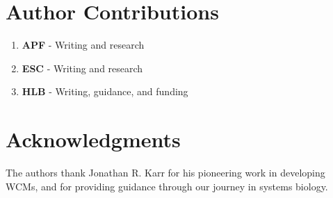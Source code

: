 \section*{Author Contributions}
\begin{enumerate}
    \item \textbf{APF} - Writing and research
    \item \textbf{ESC} - Writing and research
    \item \textbf{HLB} - Writing, guidance, and funding
\end{enumerate}

\section*{Acknowledgments}
The authors thank Jonathan R. Karr for his pioneering work in developing WCMs, and for providing guidance through our journey in systems biology.

